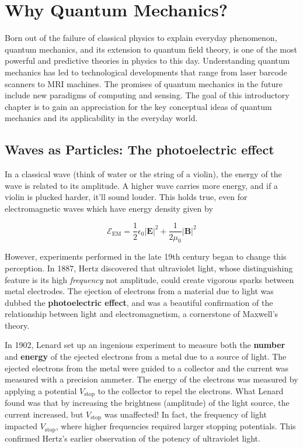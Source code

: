 
\setchapterpreamble[u]{\margintoc}
\chapter{Why Quantum Mechanics?}

Born out of the failure of classical physics to explain everyday phenomenon, quantum mechanics, and its extension to quantum field theory, is one of the most powerful and predictive theories in physics to this day. Understanding quantum mechanics has led to technological developments that range from laser barcode scanners to MRI machines. The promises of quantum mechanics in the future include new paradigms of computing and sensing. The goal of this introductory chapter is to gain an appreciation for the key conceptual ideas of quantum mechanics and its applicability in the everyday world.

\section{Waves as Particles: The photoelectric effect}

In a classical wave (think of water or the string of a violin), the energy of the wave is related to its amplitude. A higher wave carries more energy, and if a violin is plucked harder, it'll sound louder. This holds true, even for electromagnetic waves which have energy density given by

\begin{equation}
\mathcal{E}_{\text{EM}} = \frac{1}{2}\epsilon_0 |\mathbf{E}|^2 + \frac{1}{2\mu_0} |\mathbf{B}|^2 
\end{equation}

However, experiments performed in the late 19th century began to change this perception. In 1887, Hertz discovered that ultraviolet light, whose distinguishing feature is its high \textit{frequency} not amplitude, could create vigorous sparks between metal electrodes. The ejection of electrons from a material due to light was dubbed the \textbf{photoelectric effect}, and was a beautiful confirmation of the relationship between light and electromagnetism, a cornerstone of Maxwell's theory. 

In 1902, Lenard set up an ingenious experiment to measure both the \textbf{number} and \textbf{energy} of the ejected electrons from a metal due to a source of light. The ejected electrons from the metal were guided to a collector and the current was measured with a precision ammeter. The energy of the electrons was measured by applying a potential $V_{\text{stop}}$ to the collector to repel the electrons. What Lenard found was that by increasing the brightness (amplitude) of the light source, the current increased, but $V_{\text{stop}}$ was unaffected! In fact, the frequency of light impacted $V_{\text{stop}} $, where higher frequencies required larger stopping potentials. This confirmed Hertz's earlier observation of the potency of ultraviolet light. 

